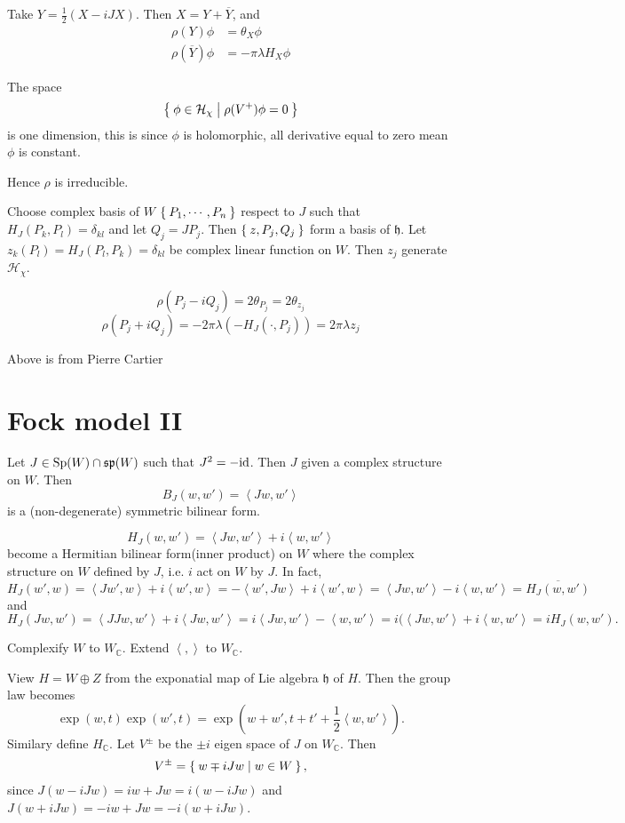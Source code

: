 \documentclass[12pt]{article}
\def\bC{{\mathbb{C}}}
\def\sp{{\mathfrak{sp}}}
\def\id{{\rm id}}
\def\inn#1#2{\left\langle{#1},{#2}\right\rangle}
\def\Sp{{\rm Sp}}
\def\fhh{\mathfrak{h}}
\def\chh{\mathcal{H}}
\begin{document}
Take $Y = \frac{1}{2}(X-iJX)$. Then $X = Y + \overline{Y}$, 
and 
\begin{align*}
\rho(Y) \phi &= \theta_X \phi \\
\rho(\overline{Y}) \phi &= -\pi \lambda H_X \phi
\end{align*}

The space 
\[
\Set{\phi \in \chh_\chi |\rho(V^+) \phi = 0}
\]
is one dimension, this is since $\phi$ is holomorphic, 
all derivative equal to zero mean $\phi$ is constant. 

Hence $\rho$ is irreducible. 

Choose complex basis of $W$ $\Set{P_1, \cdots, P_n}$
respect to $J$ such that
$H_J(P_k, P_l) = \delta_{kl}$ and let $Q_j = J P_j$. 
Then $\Set{z, P_j, Q_j}$ form a basis of $\fhh$. 
Let $z_k(P_l) = H_J(P_l, P_k) =\delta_{kl}$ be complex linear function on 
$W$. Then $z_j$ generate $\chh_\chi$. 

\[
\rho(P_j-iQ_j) = 2 \theta_{P_j} =  2\theta_{z_j}
\]
\[
\rho(P_j+iQ_j) = -2\pi\lambda (-H_J(\cdot,P_j)) 
 = 2\pi \lambda z_j
\]

Above is from Pierre Cartier 

\section{Fock model II}
Let $J\in \Sp(W)\cap \sp(W)$ such that $J^2 = -\id$.
Then $J$ given a complex structure on $W$.
Then 
\[
B_J(w,w') = \inn{Jw}{w'}
\]
is a (non-degenerate) symmetric bilinear form.

\[
H_J(w,w') = \inn{Jw}{w'} + i\inn{w}{w'}
\]
become a Hermitian bilinear form(inner product) on $W$ where the 
complex structure on $W$ defined by $J$, i.e. $i$ act on $W$ by $J$. 
In fact,
\[
H_J(w',w) = \inn{Jw'}{w} + i \inn{w'}{w} = -\inn{w'}{Jw} + i\inn{w'}{w}
= \inn{Jw}{w'} - i \inn{w}{w'}= \overline{H_J(w,w')}
\]
and
\[
H_J(Jw,w') = \inn{JJw}{w'} + i\inn{Jw}{w'} = i\inn{Jw}{w'} - \inn{w}{w'} 
= i(\inn{Jw}{w'} + i\inn{w}{w'} = i H_J(w,w').
\]

Complexify $W$ to $W_\bC$. Extend $\inn{}{}$ to $W_\bC$.  
 
View $H = W\oplus Z$ from the exponatial map of Lie algebra $\fhh$ of $H$. 
Then the group law becomes
\[
\exp(w, t) \exp(w',t) = \exp(w+w', t+t'+\frac{1}{2}\inn{w}{w'}).
\]
Similary define $H_\bC$. 
Let $V^\pm$ be the $\pm i$ eigen space of $J$ on $W_\bC$. 
Then 
\[
V^\pm = \Set{w \mp iJw | w\in W },
\] 
since $J(w - iJw) = iw+Jw = i(w-iJw)$ and
$J(w+iJw) = -iw + Jw = -i(w+iJw)$.
\end{document}
